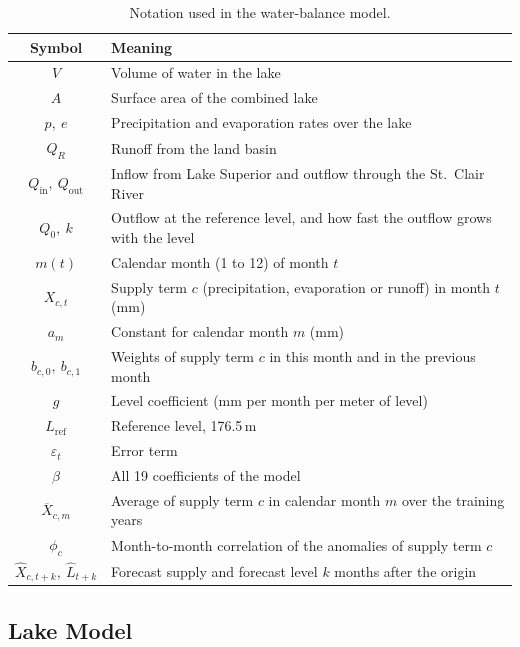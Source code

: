 \documentclass{article}
\begin{document}
\begin{table}[htbp]
\centering
\caption{Notation used in the water-balance model.}
\label{tab:notation-wb}
\begin{tabular}{||c|l||}
\hline\hline
Symbol & Meaning \\
\hline\hline
$V$ & Volume of water in the lake \\
$A$ & Surface area of the combined lake \\
$p,\ e$ & Precipitation and evaporation rates over the lake \\
$Q_R$ & Runoff from the land basin \\
$Q_{\mathrm{in}},\ Q_{\mathrm{out}}$ & Inflow from Lake Superior and outflow through the
St.~Clair River \\
$Q_0,\ k$ & Outflow at the reference level, and how fast the outflow grows with the level \\
$m(t)$ & Calendar month (1 to 12) of month $t$ \\
$X_{c,t}$ & Supply term $c$ (precipitation, evaporation or runoff) in month $t$ (mm) \\
$a_m$ & Constant for calendar month $m$ (mm) \\
$b_{c,0},\ b_{c,1}$ & Weights of supply term $c$ in this month and in the previous month \\
$g$ & Level coefficient (mm per month per meter of level) \\
$L_{\mathrm{ref}}$ & Reference level, 176.5\,m \\
$\varepsilon_t$ & Error term \\
$\beta$ & All 19 coefficients of the model \\
$\overline{X}_{c,m}$ & Average of supply term $c$ in calendar month $m$ over the training years \\
$\phi_c$ & Month-to-month correlation of the anomalies of supply term $c$ \\
$\hat X_{c,t+k},\ \hat L_{t+k}$ & Forecast supply and forecast level $k$ months after the origin \\
\hline\hline
\end{tabular}
\end{table}

\subsection{Lake Model}
\label{sec:lake}
\end{document}
